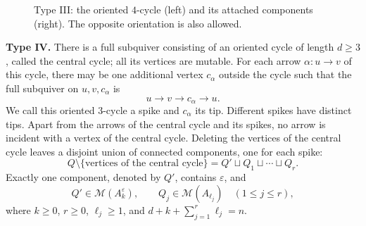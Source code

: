 \documentclass[a4paper, 12pt, reqno]{amsart}
\theoremstyle{definition}
\begin{document}
\begin{figure}[htbp]
\centering
{}
\caption{Type III: the oriented $4$-cycle (left) and its attached
components (right). The opposite orientation is also allowed.}
\label{fig:type-III}
\end{figure}

\medskip
\noindent\textbf{Type IV.}
There is a full subquiver consisting of an oriented cycle of length $d\geq3$, called the central cycle; all its vertices are mutable. For each arrow $\alpha:u\longrightarrow v$ of this cycle, there may be one additional vertex $c_\alpha$ outside the cycle such that the full subquiver on $u,v,c_\alpha$ is
\[
u\longrightarrow v\longrightarrow c_\alpha\longrightarrow u.
\]
We call this oriented $3$-cycle a spike and $c_\alpha$ its tip. Different spikes have distinct tips. Apart from the arrows of the central cycle and its spikes, no arrow is incident with a vertex of the central cycle. Deleting the vertices of the central cycle leaves a disjoint union
of connected components, one for each spike:
\[
Q\setminus\{\text{vertices of the central cycle}\}=Q'\sqcup Q_1\sqcup\cdots\sqcup Q_r.
\]
Exactly one component, denoted by $Q'$, contains $\varepsilon$, and
\[
Q'\in\mathcal{M}(A_k^\varepsilon), \qquad Q_j\in\mathcal{M}(A_{\ell_j}) \quad(1\leq j\leq r),
\]
where $k\geq0$, $r\geq0$, $\ell_j\geq1$, and $d+k+\sum_{j=1}^{r}\ell_j=n.$
\end{document}
